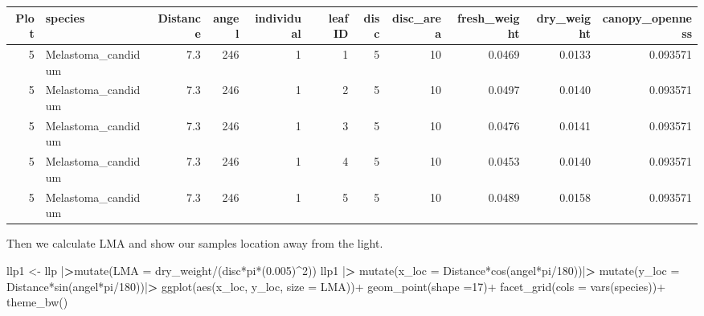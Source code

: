 \documentclass[
]{article}
\newenvironment{Shaded}{\begin{snugshade}}{\end{snugshade}}
\newcommand{\AttributeTok}[1]{\textcolor[rgb]{0.77,0.63,0.00}{#1}}
\newcommand{\DecValTok}[1]{\textcolor[rgb]{0.00,0.00,0.81}{#1}}
\newcommand{\ErrorTok}[1]{\textcolor[rgb]{0.64,0.00,0.00}{\textbf{#1}}}
\newcommand{\FloatTok}[1]{\textcolor[rgb]{0.00,0.00,0.81}{#1}}
\newcommand{\FunctionTok}[1]{\textcolor[rgb]{0.00,0.00,0.00}{#1}}
\newcommand{\NormalTok}[1]{#1}
\newcommand{\OtherTok}[1]{\textcolor[rgb]{0.56,0.35,0.01}{#1}}
\newcommand{\SpecialCharTok}[1]{\textcolor[rgb]{0.00,0.00,0.00}{#1}}
\begin{document}
\begin{table}
\centering
\begin{tabular}[t]{r|l|r|r|r|r|r|r|r|r|r}
\hline
Plot & species & Distance & angel & individual & leaf ID & disc & disc\_area & fresh\_weight & dry\_weight & canopy\_openness\\
\hline
5 & Melastoma\_candidum & 7.3 & 246 & 1 & 1 & 5 & 10 & 0.0469 & 0.0133 & 0.093571\\
\hline
5 & Melastoma\_candidum & 7.3 & 246 & 1 & 2 & 5 & 10 & 0.0497 & 0.0140 & 0.093571\\
\hline
5 & Melastoma\_candidum & 7.3 & 246 & 1 & 3 & 5 & 10 & 0.0476 & 0.0141 & 0.093571\\
\hline
5 & Melastoma\_candidum & 7.3 & 246 & 1 & 4 & 5 & 10 & 0.0453 & 0.0140 & 0.093571\\
\hline
5 & Melastoma\_candidum & 7.3 & 246 & 1 & 5 & 5 & 10 & 0.0489 & 0.0158 & 0.093571\\
\hline
\end{tabular}
\end{table}

Then we calculate LMA and show our samples location away from the light.

\begin{Shaded}
\begin{Highlighting}[]
\NormalTok{llp1 }\OtherTok{\textless{}{-}}\NormalTok{ llp }\SpecialCharTok{|}\ErrorTok{\textgreater{}}\FunctionTok{mutate}\NormalTok{(}\AttributeTok{LMA =}\NormalTok{ dry\_weight}\SpecialCharTok{/}\NormalTok{(disc}\SpecialCharTok{*}\NormalTok{pi}\SpecialCharTok{*}\NormalTok{(}\FloatTok{0.005}\NormalTok{)}\SpecialCharTok{\^{}}\DecValTok{2}\NormalTok{))}
\NormalTok{llp1 }\SpecialCharTok{|}\ErrorTok{\textgreater{}} 
  \FunctionTok{mutate}\NormalTok{(}\AttributeTok{x\_loc =}\NormalTok{ Distance}\SpecialCharTok{*}\FunctionTok{cos}\NormalTok{(angel}\SpecialCharTok{*}\NormalTok{pi}\SpecialCharTok{/}\DecValTok{180}\NormalTok{))}\SpecialCharTok{|}\ErrorTok{\textgreater{}}
  \FunctionTok{mutate}\NormalTok{(}\AttributeTok{y\_loc =}\NormalTok{ Distance}\SpecialCharTok{*}\FunctionTok{sin}\NormalTok{(angel}\SpecialCharTok{*}\NormalTok{pi}\SpecialCharTok{/}\DecValTok{180}\NormalTok{))}\SpecialCharTok{|}\ErrorTok{\textgreater{}}
  \FunctionTok{ggplot}\NormalTok{(}\FunctionTok{aes}\NormalTok{(x\_loc, y\_loc, }\AttributeTok{size =}\NormalTok{ LMA))}\SpecialCharTok{+}
  \FunctionTok{geom\_point}\NormalTok{(}\AttributeTok{shape =}\DecValTok{17}\NormalTok{)}\SpecialCharTok{+}
  \FunctionTok{facet\_grid}\NormalTok{(}\AttributeTok{cols =} \FunctionTok{vars}\NormalTok{(species))}\SpecialCharTok{+}
  \FunctionTok{theme\_bw}\NormalTok{()}
\end{Highlighting}
\end{Shaded}
\end{document}
